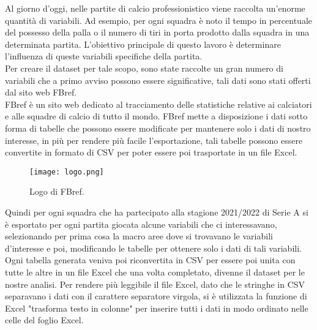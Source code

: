 Al giorno d'oggi, nelle partite di calcio professionistico viene raccolta un'enorme quantità di variabili. Ad esempio, per ogni squadra è noto il tempo in percentuale del possesso della palla o il numero di tiri in porta prodotto dalla squadra in una determinata partita. L'obiettivo principale di questo lavoro è determinare l'influenza di queste variabili specifiche della partita. \\
Per creare il dataset per tale scopo, sono state raccolte un gran numero di variabili che a primo avviso possono essere significative, tali dati sono stati offerti dal sito web FBref.\\
FBref è un sito web dedicato al tracciamento delle statistiche relative ai calciatori e alle squadre di calcio di tutto il mondo. FBref mette a disposizione i dati sotto forma di tabelle che possono essere modificate per mantenere solo i dati di nostro interesse, in più per rendere più facile l'esportazione, tali tabelle possono essere convertite in formato di CSV per poter essere poi trasportate in un file Excel.\\
\begin{figure}[!htb]
	\begin{center}
		\texttt{[image: logo.png]}
		\caption{Logo di FBref.} 
		\label{fig:logo}
	\end{center}
\end{figure}



Quindi per ogni squadra che ha partecipato alla stagione 2021/2022 di Serie A si è esportato per ogni partita giocata alcune variabili che ci interessavano, selezionando per prima cosa la macro aree dove si trovavano le variabili d'interesse e poi, modificando le tabelle per ottenere solo i dati di tali variabili. Ogni tabella generata veniva poi riconvertita in CSV per essere poi unita con tutte le altre in un file Excel che una volta completato, divenne il dataset per le nostre analisi. Per rendere più leggibile il file Excel, dato che le stringhe in CSV separavano i dati con il carattere separatore virgola, si è utilizzata la funzione di Excel "trasforma testo in colonne" per inserire tutti i dati in modo ordinato nelle celle del foglio Excel.

